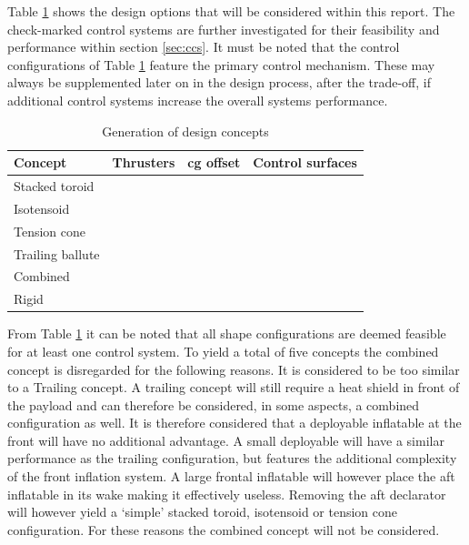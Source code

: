 Table \ref{tab:designconcepts} shows the design options that will be considered within this report. The check-marked control systems are further investigated for their feasibility and performance within section \ref{sec:ccs}. It must be noted that the control configurations of Table \ref{tab:designconcepts} feature the primary control mechanism. These may always be supplemented later on in the design process, after the trade-off, if additional control systems increase the overall systems performance. 

\begin{table}[H]
	\caption{Generation of design concepts}
	\label{tab:designconcepts}
	\centering
		\begin{tabular}{|p{}|p{}|p{}|p{}|} \hline 
			\textbf{Concept} & \textbf{Thrusters}	& \textbf{\gls{cg} offset} &  \textbf{Control surfaces} \\ \hline \hline
			Stacked toroid   & \cmark	& \cmark &  \cmark \\ \hline
			Isotensoid		 & \cmark	& \cmark &  \xmark\\  \hline
			Tension cone	 & \cmark	& \cmark &  \cmark \\ \hline
			Trailing ballute & \xmark	& \xmark &  \cmark \\ \hline
			Combined 		 & \xmark	& \xmark &  \cmark \\ \hline
			Rigid  		   	 & \cmark	& \cmark &  \cmark \\ \hline
		\end{tabular}
\end{table}

From Table \ref{tab:designconcepts} it can be noted that all shape configurations are deemed feasible for at least one control system. To yield a total of five concepts the combined concept is disregarded for the following reasons. It is considered to be too similar to a Trailing concept. A trailing concept will still require a heat shield in front of the payload and can therefore be considered, in some aspects, a combined configuration as well. It is therefore considered that a deployable inflatable at the front will have no additional advantage. A small deployable will have a similar performance as the trailing configuration, but features the additional complexity of the front inflation system. A large frontal inflatable will however place the aft inflatable in its wake making it effectively useless. Removing the aft declarator will however yield a `simple' stacked toroid, isotensoid or tension cone configuration. For these reasons the combined concept will not be considered. 
 

